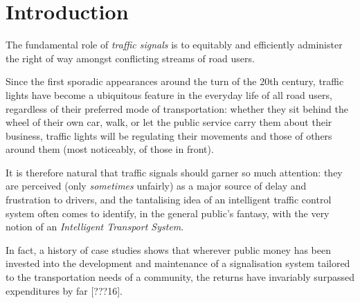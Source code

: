 \chapter*{Introduction}
The fundamental role of \emph{traffic signals} is to equitably and efficiently administer the right of way amongst conflicting streams of road users.

Since the first sporadic appearances around the turn of the 20th century, traffic lights have become a ubiquitous feature in the everyday life of all road users, regardless of their preferred mode of transportation: whether they sit behind the wheel of their own car, walk, or let the public service carry them about their business, traffic lights will be regulating their movements and those of others around them (most noticeably, of those in front).

It is therefore natural that traffic signals should garner so much attention: they are perceived (only \emph{sometimes} unfairly) as a major source of delay and frustration to drivers, and the tantalising idea of an intelligent traffic control system often comes to identify, in the general public’s fantasy, with the very notion of an \emph{Intelligent Transport System}.

In fact, a history of case studies shows that wherever public money has been invested into the development and maintenance of a signalisation system tailored to the transportation needs of a community, the returns have invariably surpassed expenditures by far [???16].
